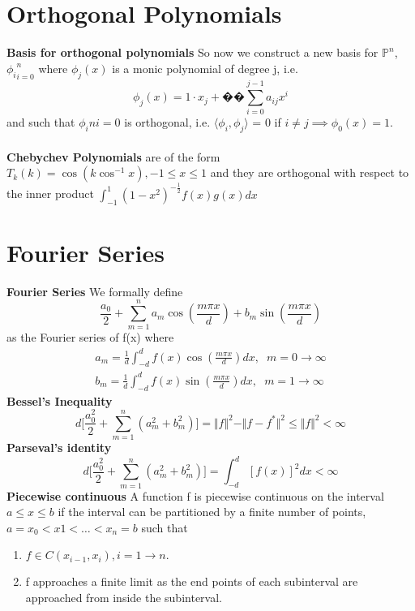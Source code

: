 \documentclass{article}
\begin{document}
\section{Orthogonal Polynomials}
\textbf{Basis for orthogonal polynomials}
So now we construct a new basis for $\mathbb{P}^n$, ${\phi_i}^n_{i=0}$ where $\phi_j(x)$ is a monic polynomial of degree j, i.e.$$
\phi_j(x)= 1 \cdot x_j +��\sum_{i=0}^{j-1} a_{ij}x^i
$$
and such that ${\phi_i}ni=0 $ is orthogonal, i.e. $\langle \phi_i,\phi_j \rangle$ = 0 if $i \ne  j \implies \phi_0(x) = 1$.
\\
\\
\textbf{Chebychev Polynomials}
are of the form $T_k(k) = \cos (k \cos^{-1} x), -1 \leq x \leq 1$ and they are orthogonal with respect to the inner product $\int_{-1}^1 (1 - x^2)^{-\frac{1}{2}} f(x)g(x) dx$
\section{Fourier Series}
\textbf{Fourier Series}
We formally define
$$\frac{a_0}{2} + \sum_{m=1}^n a_m \cos(\frac{m\pi x}{d})  + b_m \sin(\frac{m\pi x}{d}) 
$$
as the Fourier series of f(x) where
\begin{align*}
  a_m = \frac{1}{d}\int_{-d}^d f(x) \cos(\frac{m\pi x}{d}) dx, \hspace{7pt} m = 0 \to \infty \\
b_m = \frac{1}{d}\int_{-d}^d f(x) \sin(\frac{m\pi x}{d}) dx, \hspace{7pt} m = 1 \to \infty
\end{align*}
\textbf{Bessel's Inequality} 
$$
d \bigg [ \frac{a_0^2}{2} + \sum^n_{m=1} (a_m^2 + b_m^2 ) \bigg ] = \Vert f \Vert^2 - \Vert f- f^* \Vert^2 \leq \Vert f \Vert^2 < \infty
$$
\textbf{Parseval's identity} 
$$
d \bigg [ \frac{a_0^2}{2} + \sum^n_{m=1} (a_m^2 + b_m^2 ) \bigg ] = \int_{-d}^d [f(x)]^2 dx < \infty
$$
\textbf{Piecewise continuous}
A function f is piecewise continuous on the interval $a \leq x \leq b$ if the interval can be partitioned by a finite number of points,$a=x_0 <x1 < \dots < x_n = b$ such that


\renewcommand{\theenumi}{\roman{enumi}}
 \begin{enumerate}
   \item $f \in C(x_{i - 1},x_i),i = 1 \to n.$
   \item f approaches a finite limit as the end points of each subinterval are approached from inside the subinterval.
\end{enumerate}
\end{document}
